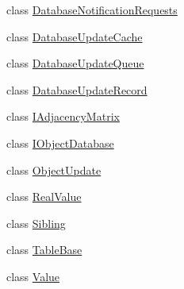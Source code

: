 \begin{DoxyCompactItemize}
class \hyperlink{class_n_m_1_1_o_d_b_1_1_database_notification_requests}{Database\+Notification\+Requests}
\item 
class \hyperlink{class_n_m_1_1_o_d_b_1_1_database_update_cache}{Database\+Update\+Cache}
\item 
class \hyperlink{class_n_m_1_1_o_d_b_1_1_database_update_queue}{Database\+Update\+Queue}
\item 
class \hyperlink{class_n_m_1_1_o_d_b_1_1_database_update_record}{Database\+Update\+Record}
\item 
class \hyperlink{class_n_m_1_1_o_d_b_1_1_i_adjacency_matrix}{I\+Adjacency\+Matrix}
\item 
class \hyperlink{class_n_m_1_1_o_d_b_1_1_i_object_database}{I\+Object\+Database}
\item 
class \hyperlink{class_n_m_1_1_o_d_b_1_1_object_update}{Object\+Update}
\item 
class \hyperlink{class_n_m_1_1_o_d_b_1_1_real_value}{Real\+Value}
\item 
class \hyperlink{class_n_m_1_1_o_d_b_1_1_sibling}{Sibling}
\item 
class \hyperlink{class_n_m_1_1_o_d_b_1_1_table_base}{Table\+Base}
\item 
class \hyperlink{class_n_m_1_1_o_d_b_1_1_value}{Value}
\end{DoxyCompactItemize}
